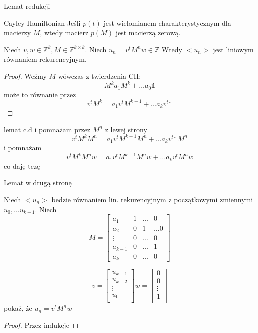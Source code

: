 \documentclass{beamer}
\theoremstyle{definition}
\begin{document}
\begin{frame}{Lemat redukcji}

\begin{theorem}{Cayley-Hamiltonian}
    Jeśli $p(t)$ jest wielomianem charakterystycznym dla macierzy $M$, wtedy macierz $p(M)$ jest macierzą zerową. 
\end{theorem}

\begin{theorem}

    Niech $v, w \in \mathbb{Z}^{k}, M \in \mathbb{Z}^{k\times k}$.
    Niech $u_n = v^{t}M^{n}w \in \mathbb{Z}$
    Wtedy $<u_n>$ jest liniowym równaniem rekurencyjnym. 

\end{theorem}



\begin{proof}
    Weźmy $M$ wówczas z twierdzenia CH: 
    $$M^{k} a_1 M^{k} + \ldots a_0 \mathbb{1}$$ 
    może to równanie przez 
    $$ v^{t}M^{k} = a_1 v^{t} M^{k-1} + \ldots a_k v^{t} \mathbb{1}$$ 
\end{proof}

\end{frame}

\begin{frame}{lemat c.d}
i pomnażam przez $M^{n}$ z lewej strony 
      $$ v^{t}M^{k} M^{n} = a_1 v^{t} M^{k-1} M^{n} + \ldots a_k v^{t} \mathbb{1} M^{n}$$ 
      i pomnażam 
      $$ v^{t}M^{k} M^{n} w = a_1 v^{t} M^{k-1} M^{n}w + \ldots a_k v^{t} M^{n}w $$ 
      co daję tezę
\end{frame}

\begin{frame}{Lemat w drugą stronę}
\begin{theorem}
    Niech $<u_n>$ bedzie równaniem lin. rekurencyjnym z początkowymi zmiennymi $u_0, \ldots u_{k-1}$. 
    Niech
    $$
    M = \begin{bmatrix}
    a_{1} & 1 &  \ldots & 0 \\
    a_{2} & 0 & 1 & \ldots 0  \\
    \vdots & 0 & \ldots & 0 \\ 
    a_{k-1} & 0 & \ldots & 1 \\
    a_{k} & 0 & \ldots & 0
    \end{bmatrix}
    $$

    $$v= \begin{bmatrix}
    u_{k-1} \\ u_{k-2} \\ \vdots \\ u_{0} \\
    \end{bmatrix}
    w =  \begin{bmatrix}
    0 \\ 0 \\ \vdots \\ 1 \\
    \end{bmatrix}
    $$
    pokaż, że $u_n = v^{t} M^{n} w$
\end{theorem}
\begin{proof}
    Przez indukcje
\end{proof}
\end{frame}
\end{document}
